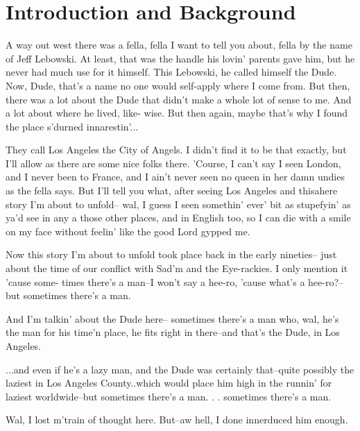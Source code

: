\chapter{Introduction and Background}
\label{chap:intro}

A way out west there was a fella, 
fella I want to tell you about, fella 
by the name of Jeff Lebowski. At 
least, that was the handle his lovin' 
parents gave him, but he never had 
much use for it himself. This 
Lebowski, he called himself the Dude. 
Now, Dude, that's a name no one would 
self-apply where I come from. But 
then, there was a lot about the Dude 
that didn't make a whole lot of sense 
to me. And a lot about where he 
lived, like- wise. But then again, 
maybe that's why I found the place 
s'durned innarestin'...

They call Los Angeles the City of 
Angels. I didn't find it to be that 
exactly, but I'll allow as there are 
some nice folks there. 'Course, I 
can't say I seen London, and I never 
been to France, and I ain't never 
seen no queen in her damn undies as 
the fella says. But I'll tell you 
what, after seeing Los Angeles and 
thisahere story I'm about to unfold--
wal, I guess I seen somethin' ever' 
bit as stupefyin' as ya'd see in any 
a those other places, and in English 
too, so I can die with a smile on my 
face without feelin' like the good 
Lord gypped me.

Now this story I'm about to unfold 
took place back in the early nineties--
just about the time of our conflict 
with Sad'm and the Eye-rackies. I 
only mention it 'cause some- times 
there's a man--I won't say a hee-ro, 
'cause what's a hee-ro?--but sometimes 
there's a man.

And I'm talkin' about the Dude here-- 
sometimes there's a man who, wal, 
he's the man for his time'n place, 
he fits right in there--and that's 
the Dude, in Los Angeles.

...and even if he's a lazy man, and 
the Dude was certainly that--quite 
possibly the laziest in Los Angeles 
County..which would place him high in the 
runnin' for laziest worldwide--but 
sometimes there's a man. . . sometimes 
there's a man.

Wal, I lost m'train of thought here. 
But--aw hell, I done innerduced him 
enough.
